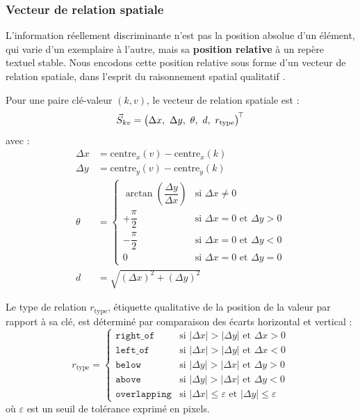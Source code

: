 \subsubsection{Vecteur de relation spatiale}

L'information réellement discriminante n'est pas la position absolue d'un élément, qui varie
d'un exemplaire à l'autre, mais sa \textbf{position relative} à un repère textuel stable.
Nous encodons cette position relative sous forme d'un vecteur de relation spatiale, dans
l'esprit du raisonnement spatial qualitatif \cite{cohn2001qualitative}.

\begin{definition}
\label{def:vecteur-spatial}
Pour une paire clé-valeur $(k, v)$, le vecteur de relation spatiale est :
\begin{equation}
\svec = \big(\Delta x,\ \Delta y,\ \theta,\ d,\ r_{\text{type}}\big)^{\!\top}
\end{equation}
avec :
\begin{align}
\Delta x &= \mathrm{centre}_x(v) - \mathrm{centre}_x(k)\\
\Delta y &= \mathrm{centre}_y(v) - \mathrm{centre}_y(k)\\
\theta &=
\begin{cases}
\arctan\!\left(\dfrac{\Delta y}{\Delta x}\right) & \text{si } \Delta x \neq 0\\[2mm]
+\dfrac{\pi}{2} & \text{si } \Delta x = 0 \text{ et } \Delta y > 0\\[2mm]
-\dfrac{\pi}{2} & \text{si } \Delta x = 0 \text{ et } \Delta y < 0\\[2mm]
0 & \text{si } \Delta x = 0 \text{ et } \Delta y = 0
\end{cases}\\
d &= \sqrt{(\Delta x)^2 + (\Delta y)^2}
\end{align}
\end{definition}

\begin{definition}
\label{def:type-relation}
Le type de relation $r_{\text{type}}$, étiquette qualitative de la position de la valeur par
rapport à sa clé, est déterminé par comparaison des écarts horizontal et vertical :
\begin{equation}
r_{\text{type}} =
\begin{cases}
\texttt{right\_of} & \text{si } |\Delta x| > |\Delta y| \text{ et } \Delta x > 0\\
\texttt{left\_of} & \text{si } |\Delta x| > |\Delta y| \text{ et } \Delta x < 0\\
\texttt{below} & \text{si } |\Delta y| > |\Delta x| \text{ et } \Delta y > 0\\
\texttt{above} & \text{si } |\Delta y| > |\Delta x| \text{ et } \Delta y < 0\\
\texttt{overlapping} & \text{si } |\Delta x| \leq \varepsilon \text{ et } |\Delta y| \leq \varepsilon
\end{cases}
\end{equation}
où $\varepsilon$ est un seuil de tolérance exprimé en pixels.
\end{definition}

